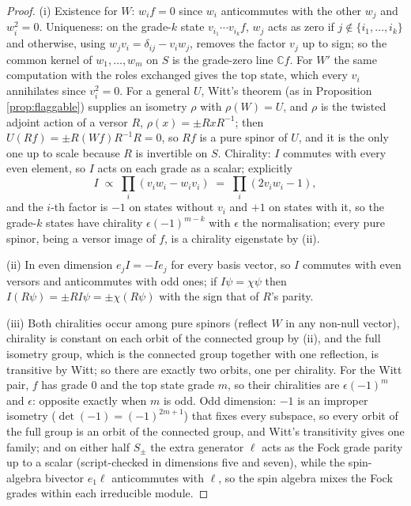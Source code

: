 \documentclass[11pt]{article}
\theoremstyle{definition}
\newcommand{\C}{\mathbb{C}}
\begin{document}
\begin{proof}
(i) Existence for $W$: $w_{i}f = 0$ since $w_{i}$ anticommutes with the other $w_{j}$ and $w_{i}^{2} = 0$. Uniqueness: on the grade-$k$ state $v_{i_{1}}\cdots v_{i_{k}}f$, $w_{j}$ acts as zero if $j \notin \{i_{1}, \ldots, i_{k}\}$ and otherwise, using $w_{j}v_{i} = \delta_{ij} - v_{i}w_{j}$, removes the factor $v_{j}$ up to sign; so the common kernel of $w_{1}, \ldots, w_{m}$ on $S$ is the grade-zero line $\C f$. For $W'$ the same computation with the roles exchanged gives the top state, which every $v_{i}$ annihilates since $v_{i}^{2} = 0$. For a general $U$, Witt's theorem (as in Proposition \ref{prop:flaggable}) supplies an isometry $\rho$ with $\rho(W) = U$, and $\rho$ is the twisted adjoint action of a versor $R$, $\rho(x) = \pm RxR^{-1}$; then $U(Rf) = \pm R(Wf)R^{-1}R = 0$, so $Rf$ is a pure spinor of $U$, and it is the only one up to scale because $R$ is invertible on $S$. Chirality: $I$ commutes with every even element, so $I$ acts on each grade as a scalar; explicitly
\[
I \;\propto\; \prod_{i}(v_{i}w_{i} - w_{i}v_{i}) \;=\; \prod_{i}(2v_{i}w_{i} - 1),
\]
and the $i$-th factor is $-1$ on states without $v_{i}$ and $+1$ on states with it, so the grade-$k$ states have chirality $\epsilon(-1)^{m-k}$ with $\epsilon$ the normalisation; every pure spinor, being a versor image of $f$, is a chirality eigenstate by (ii).

(ii) In even dimension $e_{j}I = -Ie_{j}$ for every basis vector, so $I$ commutes with even versors and anticommutes with odd ones; if $I\psi = \chi\psi$ then $I(R\psi) = \pm R I\psi = \pm\chi(R\psi)$ with the sign that of $R$'s parity.

(iii) Both chiralities occur among pure spinors (reflect $W$ in any non-null vector), chirality is constant on each orbit of the connected group by (ii), and the full isometry group, which is the connected group together with one reflection, is transitive by Witt; so there are exactly two orbits, one per chirality. For the Witt pair, $f$ has grade $0$ and the top state grade $m$, so their chiralities are $\epsilon(-1)^{m}$ and $\epsilon$: opposite exactly when $m$ is odd. Odd dimension: $-1$ is an improper isometry ($\det(-1) = (-1)^{2m+1}$) that fixes every subspace, so every orbit of the full group is an orbit of the connected group, and Witt's transitivity gives one family; and on either half $S_{\pm}$ the extra generator $\ell$ acts as the Fock grade parity up to a scalar (script-checked in dimensions five and seven), while the spin-algebra bivector $e_{1}\ell$ anticommutes with $\ell$, so the spin algebra mixes the Fock grades within each irreducible module.


\end{proof}
\end{document}
